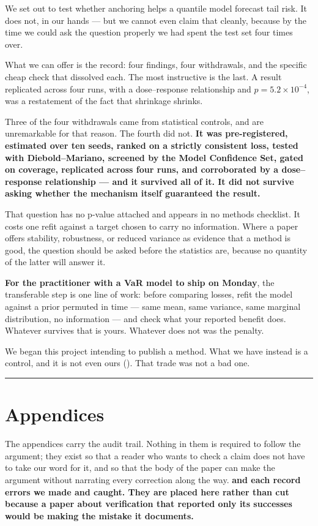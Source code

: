 We set out to test whether anchoring helps a quantile model forecast tail risk. It does not, in
our hands --- but we cannot even claim that cleanly, because by the time we could ask the
question properly we had spent the test set four times over.

What we can offer is the record: four findings, four withdrawals, and the specific cheap check
that dissolved each. The most instructive is the last. A result replicated across four runs,
with a dose--response relationship and \(p = 5.2 \times 10^{-4}\), was a restatement of the fact that shrinkage
shrinks.

Three of the four withdrawals came from statistical controls, and are unremarkable for that
reason. The fourth did not. \textbf{It was pre-registered, estimated over ten seeds, ranked on a
strictly consistent loss, tested with Diebold--Mariano, screened by the Model Confidence Set,
gated on coverage, replicated across four runs, and corroborated by a dose--response
relationship --- and it survived all of it. It did not survive asking whether the mechanism itself
guaranteed the result.}

That question has no p-value attached and appears in no methods checklist. It costs one refit
against a target chosen to carry no information. Where a paper offers stability, robustness, or
reduced variance as evidence that a method is good, the question should be asked before the
statistics are, because no quantity of the latter will answer it.

\textbf{For the practitioner with a VaR model to ship on Monday}, the transferable step is one line
of work: before comparing losses, refit the model against a prior permuted in time --- same mean,
same variance, same marginal distribution, no information --- and check what your reported benefit
does. Whatever survives that is yours. Whatever does not was the penalty.

We began this project intending to publish a method. What we have instead is a control, and it
is not even ours (). That trade was not a bad one.

\begin{center}\rule{0.5\linewidth}{0.5pt}\end{center}

\hypertarget{appendices}{%
\section{Appendices}\label{appendices}}

The appendices carry the audit trail. Nothing in them is required to follow the argument; they
exist so that a reader who wants to check a claim does not have to take our word for it, and so
that the body of the paper can make the argument without narrating every correction along the
way. \textbf{ and  each record errors we made and caught. They are placed here
rather than cut because a paper about verification that reported only its successes would be
making the mistake it documents.}
